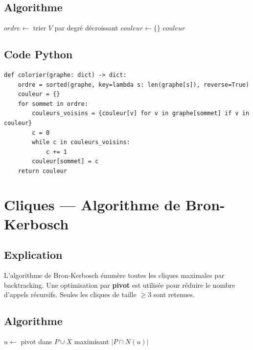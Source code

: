 \documentclass[12pt, a4paper]{article}
\begin{document}
\subsection{Algorithme}
\begin{algorithm}[H]
    \caption{Coloration gloutonne Welsh-Powell}
    $\mathit{ordre} \leftarrow$ trier $V$ par degré décroissant\;
    $\mathit{couleur} \leftarrow \{\}$\;
    \Retourner $\mathit{couleur}$\;
\end{algorithm}

\subsection{Code Python}
\begin{lstlisting}[style=python, caption={colorier(graphe)}]
def colorier(graphe: dict) -> dict:
    ordre = sorted(graphe, key=lambda s: len(graphe[s]), reverse=True)
    couleur = {}
    for sommet in ordre:
        couleurs_voisins = {couleur[v] for v in graphe[sommet] if v in couleur}
        c = 0
        while c in couleurs_voisins:
            c += 1
        couleur[sommet] = c
    return couleur
\end{lstlisting}

\section{Cliques — Algorithme de Bron-Kerbosch}
\subsection{Explication}
\begin{tcolorbox}[explication]
    L'algorithme de Bron-Kerbosch énumère toutes les cliques maximales par backtracking. Une optimisation par \textbf{pivot} est utilisée pour réduire le nombre d'appels récursifs. Seules les cliques de taille $\geq 3$ sont retenues.
\end{tcolorbox}

\subsection{Algorithme}
\begin{algorithm}[H]
    \caption{Bron-Kerbosch avec Pivot}
    $u \leftarrow$ pivot dans $P \cup X$ maximisant $|P \cap N(u)|$\;
\end{algorithm}
\end{document}
